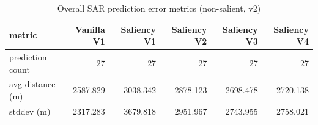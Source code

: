 \begin{table}[ht]
\centering
\caption{Overall SAR prediction error metrics (non-salient, v2)}
\label{tab:sar-overall-errors-non-salient,-v2}
\begin{tabular}{lrrrrr}
\hline
metric & Vanilla V1 & Saliency V1 & Saliency V2 & Saliency V3 & Saliency V4 \\
\hline
prediction count & 27 & 27 & 27 & 27 & 27 \\
avg distance (m) & 2587.829 & 3038.342 & 2878.123 & 2698.478 & 2720.138 \\
stddev (m) & 2317.283 & 3679.818 & 2951.967 & 2743.955 & 2758.021 \\
\hline
\end{tabular}
\end{table}
